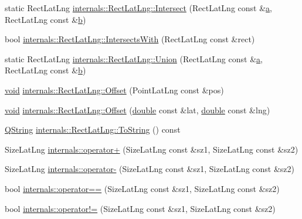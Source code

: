 \begin{DoxyCompactItemize}
\item 
static Rect\-Lat\-Lng \hyperlink{group___o_p_map_widget_ga6590bcf87d4c6a72e570bcfcca89a5bf}{internals\-::\-Rect\-Lat\-Lng\-::\-Intersect} (Rect\-Lat\-Lng const \&\hyperlink{glext_8h_ac8729153468b5dcf13f971b21d84d4e5}{a}, Rect\-Lat\-Lng const \&\hyperlink{glext_8h_a6eba317e3cf44d6d26c04a5a8f197dcb}{b})
\item 
bool \hyperlink{group___o_p_map_widget_ga3d1953efc67a3592589cff53c33e119a}{internals\-::\-Rect\-Lat\-Lng\-::\-Intersects\-With} (Rect\-Lat\-Lng const \&rect)
\item 
static Rect\-Lat\-Lng \hyperlink{group___o_p_map_widget_ga2b63b270f234d9f18a58415ff69b37e7}{internals\-::\-Rect\-Lat\-Lng\-::\-Union} (Rect\-Lat\-Lng const \&\hyperlink{glext_8h_ac8729153468b5dcf13f971b21d84d4e5}{a}, Rect\-Lat\-Lng const \&\hyperlink{glext_8h_a6eba317e3cf44d6d26c04a5a8f197dcb}{b})
\item 
\hyperlink{group___u_a_v_objects_plugin_ga444cf2ff3f0ecbe028adce838d373f5c}{void} \hyperlink{group___o_p_map_widget_ga2bcd916c8be03d147e8d2e80315ff66b}{internals\-::\-Rect\-Lat\-Lng\-::\-Offset} (Point\-Lat\-Lng const \&pos)
\item 
\hyperlink{group___u_a_v_objects_plugin_ga444cf2ff3f0ecbe028adce838d373f5c}{void} \hyperlink{group___o_p_map_widget_ga1a10ea11e40912f56849b245a5811942}{internals\-::\-Rect\-Lat\-Lng\-::\-Offset} (\hyperlink{_super_l_u_support_8h_a8956b2b9f49bf918deed98379d159ca7}{double} const \&lat, \hyperlink{_super_l_u_support_8h_a8956b2b9f49bf918deed98379d159ca7}{double} const \&lng)
\item 
\hyperlink{group___u_a_v_objects_plugin_gab9d252f49c333c94a72f97ce3105a32d}{Q\-String} \hyperlink{group___o_p_map_widget_ga1772321726c6fc1fc073310fd4541b12}{internals\-::\-Rect\-Lat\-Lng\-::\-To\-String} () const 
\item 
Size\-Lat\-Lng \hyperlink{group___o_p_map_widget_ga40db61334553eb3b32aee299116e616a}{internals\-::operator+} (Size\-Lat\-Lng const \&sz1, Size\-Lat\-Lng const \&sz2)
\item 
Size\-Lat\-Lng \hyperlink{group___o_p_map_widget_gab6ce9f24cd5044e4c558c513bdb96efc}{internals\-::operator-\/} (Size\-Lat\-Lng const \&sz1, Size\-Lat\-Lng const \&sz2)
\item 
bool \hyperlink{group___o_p_map_widget_gad24bfed7e42c2af0ee0f764c6cc34611}{internals\-::operator==} (Size\-Lat\-Lng const \&sz1, Size\-Lat\-Lng const \&sz2)
\item 
bool \hyperlink{group___o_p_map_widget_gaa65f8008332c3773a009a9d307330a5d}{internals\-::operator!=} (Size\-Lat\-Lng const \&sz1, Size\-Lat\-Lng const \&sz2)

\end{DoxyCompactItemize}
